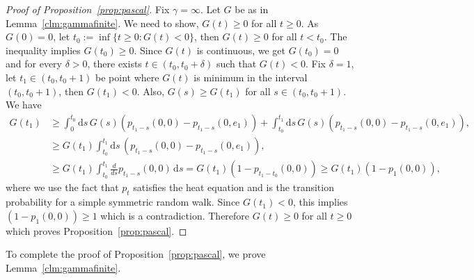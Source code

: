 \documentclass{article}[12pt]
\theoremstyle{definition}
\newcommand{\1}{\mathbbm{1}}
\newcommand{\dd }{\mathrm{d} }
\begin{document}
\begin{proof}[Proof of Proposition~\ref{prop:pascal}]
Fix $\gamma = \infty$. 
Let $G$ be as in Lemma~\ref{clm:gammafinite}. We need to show, $G(t)\ge0$ for all $t\ge 0$. As $G(0)=0$, let $t_0 := \inf\{t\ge 0: G(t) <0 \}$, then $G(t) \ge 0$ for all $t< t_0$. The inequality implies $G(t_0)\ge0$. Since $G(t)$ is continuous, we get $G(t_0) = 0$ and for every $\delta>0$, there exists $t\in (t_0,t_0+\delta)$ such that $G(t)<0$. Fix $\delta =1$, let $t_{1}\in (t_0, t_0+1)$ be point where $G(t)$ is minimum in the interval $(t_0, t_0+1)$, then $G(t_{1})<0$. Also, $G(s)\ge G(t_1)$ for all $s\in (t_0,t_0+1)$. We have 
\begin{align*}
    G(t_1)&\ge {\int_0^{t_0}\dd s\, G(s)  (p_{t_{1}-s}(0,0)- p_{t_{1}-s}(0, e_1)) +} \int_{t_0}^{t_1}\dd s\, G(s)  (p_{t_1-s}(0,0)- p_{t_1-s}(0, e_1)),\\
    &\ge  G(t_1)\int_{t_0}^{t_1}\dd s\,  (p_{t_1-s}(0,0)- p_{t_1-s}(0, e_1)),\\
    &\ge {G(t_1) \int_{t_0}^{t_1} \frac{d}{ds}p_{t_1-s}(0,0)\, \dd s = G(t_1) (1-p_{t_1-t_0}(0,0))} \ge G(t_1) (1-p_{1}(0,0)),
\end{align*}
where we use the fact that $p_t$ satisfies the heat equation and is the transition probability for a simple symmetric random walk.
{Since $G(t_1)<0$, this implies 
$(1-p_1(0,0))\ge 1$
 which is a contradiction.}
Therefore $G(t)\ge 0$ for all $t\ge 0$ which proves Proposition~\ref{prop:pascal}.
\end{proof}
To complete the proof of Proposition~\ref{prop:pascal}, we prove Lemma~\ref{clm:gammafinite}.
\end{document}
